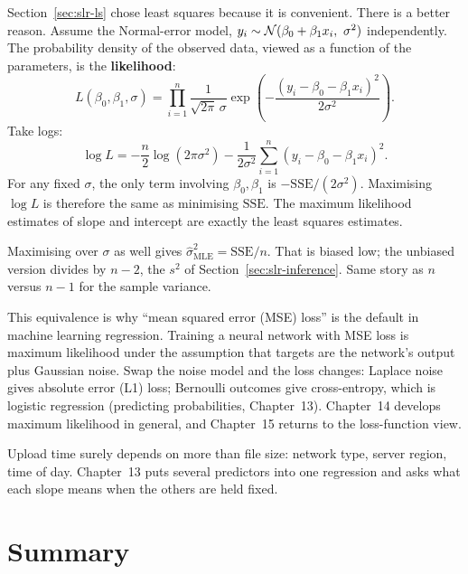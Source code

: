 Section~\ref{sec:slr-ls} chose least squares because it is convenient. There
is a better reason. Assume the Normal-error model, $y_i \sim \mathcal{N}(\beta_0+\beta_1x_i,\
\sigma^2)$ independently. The probability density of the observed data, viewed
as a function of the parameters, is the \textbf{likelihood}:
\[
  L(\beta_0,\beta_1,\sigma)
  = \prod_{i=1}^n \frac{1}{\sqrt{2\pi}\,\sigma}
    \exp\!\left(-\frac{(y_i-\beta_0-\beta_1x_i)^2}{2\sigma^2}\right).
\]
Take logs:
\[
  \log L = -\frac{n}{2}\log(2\pi\sigma^2)
           - \frac{1}{2\sigma^2}\sum_{i=1}^n (y_i-\beta_0-\beta_1x_i)^2 .
\]
For any fixed $\sigma$, the only term involving $\beta_0,\beta_1$ is
$-\mathrm{SSE}/(2\sigma^2)$. Maximising $\log L$ is therefore the same as
minimising $\mathrm{SSE}$. The maximum likelihood estimates of slope and
intercept are exactly the least squares estimates.

Maximising over $\sigma$ as well gives $\hat\sigma^2_{\text{MLE}} =
\mathrm{SSE}/n$. That is biased low; the unbiased version divides by $n-2$, the
$s^2$ of Section~\ref{sec:slr-inference}. Same story as $n$ versus $n-1$ for
the sample variance.

\begin{connectionbox}
This equivalence is why ``mean squared error (MSE) loss'' is the default in machine
learning regression. Training a neural network with MSE loss is maximum
likelihood under the assumption that targets are the network's output plus
Gaussian noise. Swap the noise model and the loss changes: Laplace noise gives
absolute error (L1) loss; Bernoulli outcomes give cross-entropy, which is
logistic regression (predicting probabilities, Chapter~13). Chapter~14 develops maximum likelihood in
general, and Chapter~15 returns to the loss-function view.
\end{connectionbox}

Upload time surely depends on more than file size: network type, server
region, time of day. Chapter~13 puts several predictors into one regression
and asks what each slope means when the others are held fixed.

\section{Summary}
\label{sec:slr-summary}

